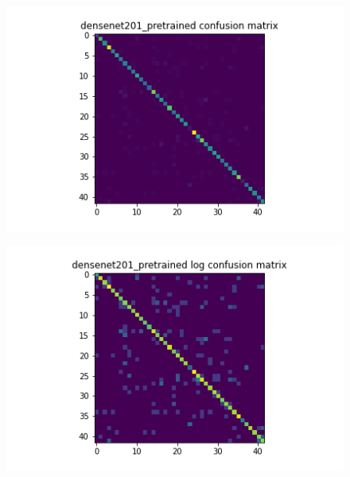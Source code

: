 \begin{figure}[t]
  \begin{minipage}[b]{.5\linewidth}
    \centering
    {\includegraphics[width=1.2\textwidth]{figs/conf_matrix/densenet201_pretrained_conf.png}}
  \end{minipage}
  \hfill
  \begin{minipage}[b]{.5\linewidth}
    \centering

    {\includegraphics[width=1.2\textwidth]{figs/conf_matrix/densenet201_pretrained_log_conf.png}}
  \end{minipage}
  \vfill
  \begin{minipage}[b]{.5\linewidth}
    \centering


\end{minipage}
\end{figure}
